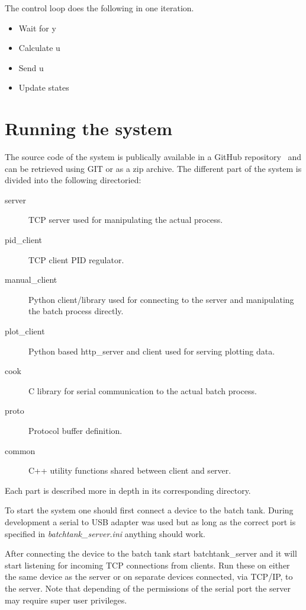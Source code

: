 \documentclass{article}
\begin{document}
The control loop does the following in one iteration.
\begin{itemize}
\item{Wait for y}
\item{Calculate u}
\item{Send u}
\item{Update states}
\end{itemize}


\section{Running the system}
The source code of the system is publically available in a GitHub
repository~\cite{repo} and can be retrieved using GIT or as a zip archive.
The different part of the system is divided into the following directoried:
\begin{description}
\item[server]
  TCP server used for manipulating the actual process.
\item[pid\_client]
  TCP client PID regulator.
\item[manual\_client]
  Python client/library used for connecting to the server and manipulating the
  batch process directly.
\item[plot\_client]
  Python based http\_server and client used for serving plotting data.
\item[cook]
  C library for serial communication to the actual batch process.
\item[proto]
  Protocol buffer definition.
\item[common]
  C++ utility functions shared between client and server.
\end{description}

Each part is described more in depth in its corresponding directory.

To start the system one should first connect a device to the batch tank.
During development a serial to USB adapter was used but as long as the
correct port is specified in \emph{batchtank\_server.ini} anything
should work.

After connecting the device to the batch tank start batchtank\_server and it will
start listening for incoming TCP connections from clients. Run these on either
the same device as the server or on separate devices connected, via TCP/IP, to
the server. Note that depending of the permissions of the serial port
the server may require super user privileges.
\end{document}
